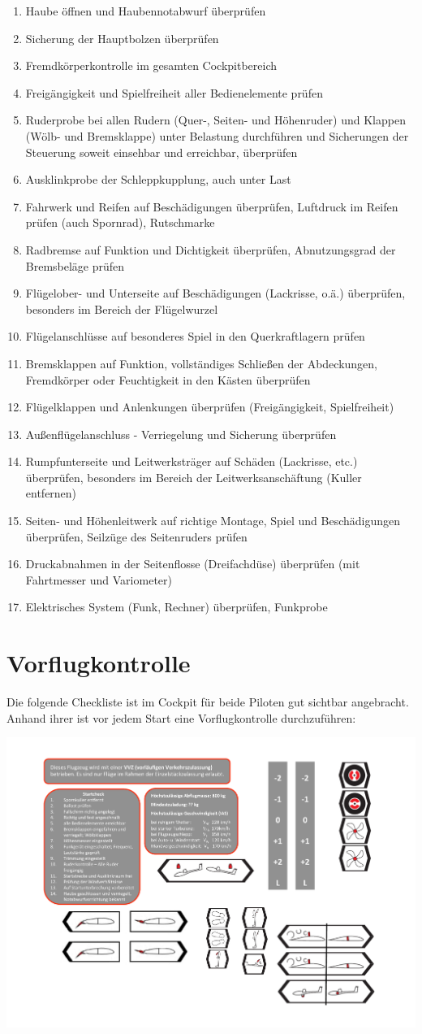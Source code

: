 \begin{enumerate}
\item Haube öffnen und Haubennotabwurf überprüfen
\item Sicherung der Hauptbolzen überprüfen
\item Fremdkörperkontrolle im gesamten Cockpitbereich
\item Freigängigkeit und Spielfreiheit aller Bedienelemente prüfen
\item Ruderprobe bei allen Rudern (Quer-, Seiten- und Höhenruder) und Klappen (Wölb- und Bremsklappe) unter Belastung durchführen und Sicherungen der Steuerung soweit einsehbar und erreichbar, überprüfen
\item Ausklinkprobe der Schleppkupplung, auch unter Last
\item Fahrwerk und Reifen auf Beschädigungen überprüfen, Luftdruck im Reifen prüfen (auch Spornrad), Rutschmarke
\item Radbremse auf Funktion und Dichtigkeit überprüfen, Abnutzungsgrad der Bremsbeläge prüfen
\item Flügelober- und Unterseite auf Beschädigungen (Lackrisse, o.ä.) überprüfen, besonders im Bereich der Flügelwurzel
\item Flügelanschlüsse auf besonderes Spiel in den Querkraftlagern prüfen
\item Bremsklappen auf Funktion, vollständiges Schließen der Abdeckungen, Fremdkörper oder Feuchtigkeit in den Kästen überprüfen
\item Flügelklappen und Anlenkungen überprüfen (Freigängigkeit, Spielfreiheit)
\item Außenflügelanschluss - Verriegelung und Sicherung überprüfen
\item Rumpfunterseite und Leitwerksträger auf Schäden (Lackrisse, etc.) 	überprüfen, besonders im Bereich der Leitwerksanschäftung (Kuller entfernen)
\item Seiten- und Höhenleitwerk auf richtige Montage, Spiel und Beschädigungen 	überprüfen, Seilzüge des Seitenruders prüfen
\item Druckabnahmen in der Seitenflosse (Dreifachdüse) überprüfen (mit 	Fahrtmesser und Variometer)
\item Elektrisches System (Funk, Rechner) überprüfen, 	Funkprobe
\end{enumerate}

\section{Vorflugkontrolle}
Die folgende Checkliste ist im Cockpit für beide Piloten gut sichtbar angebracht. Anhand ihrer ist vor jedem Start eine Vorflugkontrolle durchzuführen:
\begin{center}
\includegraphics[width=.45\textwidth]{bilder/startcheck.pdf}
\end{center}

